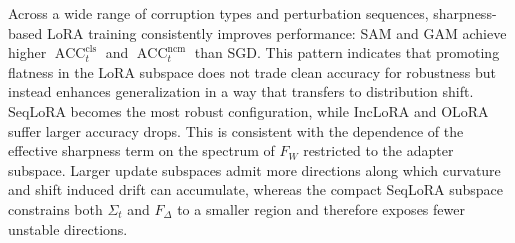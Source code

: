 \documentclass{article}
\theoremstyle{plain}
\theoremstyle{definition}
\theoremstyle{remark}
\begin{document}
Across a wide range of corruption types and perturbation sequences, sharpness-based LoRA training consistently improves performance: SAM and GAM achieve higher $\operatorname{ACC}_t^{\mathrm{cls}}$ and $\operatorname{ACC}_t^{\mathrm{ncm}}$ than SGD. This pattern indicates that promoting flatness in the LoRA subspace does not trade clean accuracy for robustness but instead enhances generalization in a way that transfers to distribution shift. SeqLoRA becomes the most robust configuration, while IncLoRA and OLoRA suffer larger accuracy drops. This is consistent with the dependence of the effective sharpness term on the spectrum of $F_W$ restricted to the adapter subspace. Larger update subspaces admit more directions along which curvature and shift induced drift can accumulate, whereas the compact SeqLoRA subspace constrains both $\Sigma_t$ and $F_\Delta$ to a smaller region and therefore exposes fewer unstable directions.


    
\end{document}
